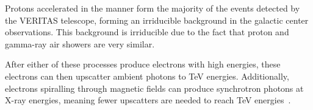   \FloatBarrier

  

  
  
  


  Protons accelerated in the manner form the majority of the events detected by the VERITAS telescope, forming an irriducible background in the galactic center observations.
  This background is irriducible due to the fact that proton and gamma-ray air showers are very similar.

  
  
  After either of these processes produce electrons with high energies, these electrons can then upscatter ambient photons to TeV energies.
  Additionally, electrons spiralling through magnetic fields can produce synchrotron photons at X-ray energies, meaning fewer upscatters are needed to reach TeV energies~\cite{self_compton}.

